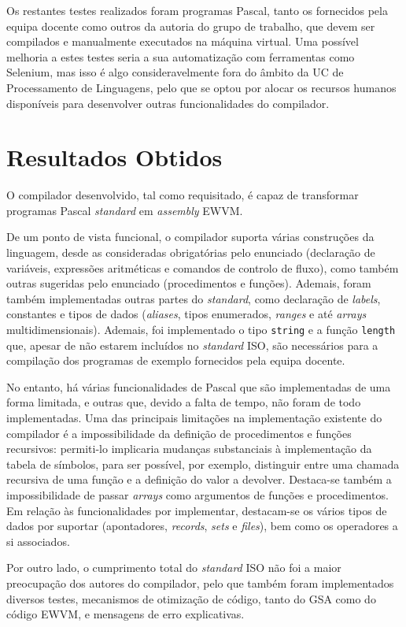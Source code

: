 \documentclass[12pt, a4paper]{article}
\begin{document}
Os restantes testes realizados foram programas Pascal, tanto os fornecidos pela equipa docente como
outros da autoria do grupo de trabalho, que devem ser compilados e manualmente executados na máquina
virtual. Uma possível melhoria a estes testes seria a sua automatização com ferramentas como
Selenium, mas isso é algo consideravelmente fora do âmbito da UC de Processamento de Linguagens,
pelo que se optou por alocar os recursos humanos disponíveis para desenvolver outras funcionalidades
do compilador.

\section{Resultados Obtidos}

O compilador desenvolvido, tal como requisitado, é capaz de transformar programas Pascal
\emph{standard} em \emph{assembly} EWVM.

De um ponto de vista funcional, o compilador suporta várias construções da linguagem, desde as
consideradas obrigatórias pelo enunciado (declaração de variáveis, expressões aritméticas e comandos
de controlo de fluxo), como também outras sugeridas pelo enunciado (procedimentos e funções).
Ademais, foram também implementadas outras partes do \emph{standard}, como declaração de
\emph{labels}, constantes e tipos de dados (\emph{aliases}, tipos enumerados, \emph{ranges} e até
\emph{arrays} multidimensionais). Ademais, foi implementado o tipo \texttt{string} e a função
\texttt{length} que, apesar de não estarem incluídos no \emph{standard} ISO, são necessários para a
compilação dos programas de exemplo fornecidos pela equipa docente.

No entanto, há várias funcionalidades de Pascal que são implementadas de uma forma limitada, e
outras que, devido a falta de tempo, não foram de todo implementadas. Uma das principais limitações
na implementação existente do compilador é a impossibilidade da definição de procedimentos e funções
recursivos: permiti-lo implicaria mudanças substanciais à implementação da tabela de símbolos, para
ser possível, por exemplo, distinguir entre uma chamada recursiva de uma função e a definição do
valor a devolver. Destaca-se também a impossibilidade de passar \emph{arrays} como argumentos de
funções e procedimentos. Em relação às funcionalidades por implementar, destacam-se os vários tipos
de dados por suportar (apontadores, \emph{records}, \emph{sets} e \emph{files}), bem como os
operadores a si associados.

Por outro lado, o cumprimento total do \emph{standard} ISO não foi a maior preocupação dos autores
do compilador, pelo que também foram implementados diversos testes, mecanismos de otimização de
código, tanto do GSA como do código EWVM, e mensagens de erro explicativas.
\end{document}
